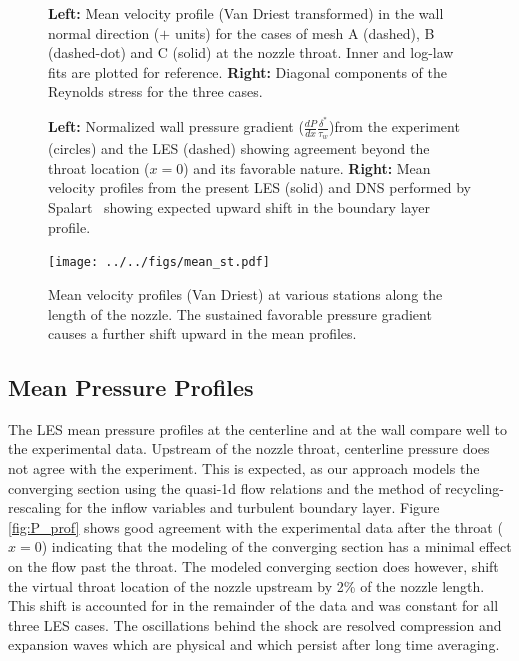 \documentclass[]{aiaa-tc}%
\begin{document}
\begin{figure}[!ht]
	\caption{ {\bf Left:} Mean velocity profile (Van Driest transformed) in the wall normal direction ($+$ units) for the cases of mesh A (dashed), B (dashed-dot) and C (solid) at the nozzle throat.  Inner and log-law fits are plotted for reference.  {\bf Right:} Diagonal components of the Reynolds stress for the three cases.
	\label{fig:BL_prof}
	}
\end{figure}


\begin{figure}[!ht]
	\caption{ {\bf Left:} Normalized wall pressure gradient ($\frac{dP}{dx} \frac{\delta^*}{\tau_w}$)from the experiment (circles) and the LES (dashed) showing agreement beyond the throat location ($x=0$) and its favorable nature.  {\bf Right:} Mean velocity profiles from the present LES (solid) and DNS performed by Spalart~\cite{Spalart:93} showing expected upward shift in the boundary layer profile.
 	\label{fig:dPdx}
	}
\end{figure}



\begin{figure}[!ht]
	\begin{centering}
	\texttt{[image: ../../figs/mean\_st.pdf]}

	\caption{ Mean velocity profiles (Van Driest) at various stations along the length of the nozzle.  The sustained favorable pressure gradient causes a further shift upward in the mean profiles.
 	\label{fig:stations}
	}
	\end{centering}
\end{figure}


\clearpage
\subsection{Mean Pressure Profiles}
The LES mean pressure profiles at the centerline and at the wall compare well to the experimental data.  Upstream of the nozzle throat, centerline pressure does not agree with the experiment.  This is expected, as our approach models the converging section using the quasi-1d flow relations and the method of recycling-rescaling for the inflow variables and turbulent boundary layer.  Figure \ref{fig:P_prof} shows good agreement with the experimental data after the throat ($x=0$) indicating that the modeling of the converging section has a minimal effect on the flow past the throat.  The modeled converging section does however, shift the virtual throat location of the nozzle upstream by 2\% of the nozzle length.  This shift is accounted for in the remainder of the data and was constant for all three LES cases.  The oscillations behind the shock are resolved compression and expansion waves which are physical and which persist after long time averaging.
\end{document}
